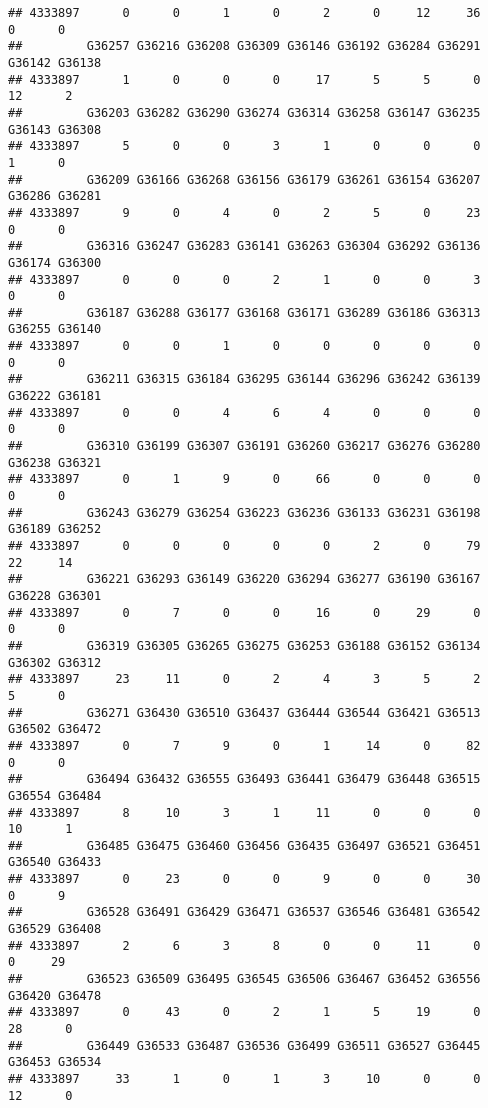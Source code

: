 \documentclass[
]{article}
\begin{document}
\begin{verbatim}
## 4333897      0      0      1      0      2      0     12     36      0      0
##         G36257 G36216 G36208 G36309 G36146 G36192 G36284 G36291 G36142 G36138
## 4333897      1      0      0      0     17      5      5      0     12      2
##         G36203 G36282 G36290 G36274 G36314 G36258 G36147 G36235 G36143 G36308
## 4333897      5      0      0      3      1      0      0      0      1      0
##         G36209 G36166 G36268 G36156 G36179 G36261 G36154 G36207 G36286 G36281
## 4333897      9      0      4      0      2      5      0     23      0      0
##         G36316 G36247 G36283 G36141 G36263 G36304 G36292 G36136 G36174 G36300
## 4333897      0      0      0      2      1      0      0      3      0      0
##         G36187 G36288 G36177 G36168 G36171 G36289 G36186 G36313 G36255 G36140
## 4333897      0      0      1      0      0      0      0      0      0      0
##         G36211 G36315 G36184 G36295 G36144 G36296 G36242 G36139 G36222 G36181
## 4333897      0      0      4      6      4      0      0      0      0      0
##         G36310 G36199 G36307 G36191 G36260 G36217 G36276 G36280 G36238 G36321
## 4333897      0      1      9      0     66      0      0      0      0      0
##         G36243 G36279 G36254 G36223 G36236 G36133 G36231 G36198 G36189 G36252
## 4333897      0      0      0      0      0      2      0     79     22     14
##         G36221 G36293 G36149 G36220 G36294 G36277 G36190 G36167 G36228 G36301
## 4333897      0      7      0      0     16      0     29      0      0      0
##         G36319 G36305 G36265 G36275 G36253 G36188 G36152 G36134 G36302 G36312
## 4333897     23     11      0      2      4      3      5      2      5      0
##         G36271 G36430 G36510 G36437 G36444 G36544 G36421 G36513 G36502 G36472
## 4333897      0      7      9      0      1     14      0     82      0      0
##         G36494 G36432 G36555 G36493 G36441 G36479 G36448 G36515 G36554 G36484
## 4333897      8     10      3      1     11      0      0      0     10      1
##         G36485 G36475 G36460 G36456 G36435 G36497 G36521 G36451 G36540 G36433
## 4333897      0     23      0      0      9      0      0     30      0      9
##         G36528 G36491 G36429 G36471 G36537 G36546 G36481 G36542 G36529 G36408
## 4333897      2      6      3      8      0      0     11      0      0     29
##         G36523 G36509 G36495 G36545 G36506 G36467 G36452 G36556 G36420 G36478
## 4333897      0     43      0      2      1      5     19      0     28      0
##         G36449 G36533 G36487 G36536 G36499 G36511 G36527 G36445 G36453 G36534
## 4333897     33      1      0      1      3     10      0      0     12      0

\end{verbatim}
\end{document}
